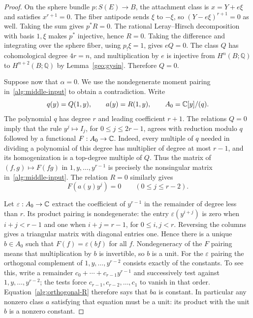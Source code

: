 \begin{proof}
On the sphere bundle $p:S(E)\to B$, the attachment class is
$x=Y+e\xi$ and satisfies $x^{r+1}=0$.  The fiber antipode sends $\xi$
to $-\xi$, so $(Y-e\xi)^{r+1}=0$ as well.  Taking the sum gives
$p^*R=0$.  The rational Leray--Hirsch decomposition with basis $1,\xi$
makes $p^*$ injective, hence $R=0$.  Taking the difference and integrating
over the sphere fiber, using $p_!\xi=1$, gives $eQ=0$.  The class $Q$ has
cohomological degree $4r=n$, and multiplication by $e$ is injective from
$H^n(B;\mathbb Q)$ to $H^{n+2}(B;\mathbb Q)$ by
Lemma~\ref{geo:gysin}.  Therefore $Q=0$.

Suppose now that $\alpha=0$.  We use the nondegenerate moment pairing
in~\eqref{alg:middle-input} to obtain a contradiction.  Write
\[
 q(y)=Q(1,y),\qquad a(y)=R(1,y),\qquad
 A_0=\mathbb C[y]/(q).
\]
The polynomial $q$ has degree $r$ and leading coefficient $r+1$.
The relations $Q=0$ imply that the rule $y^j\mapsto I_j$, for
$0\le j\le2r-1$, agrees with reduction modulo $q$ followed by a
functional $F:A_0\to\mathbb C$.  Indeed, every multiple of $q$ needed in
dividing a polynomial of this degree has multiplier of degree at most
$r-1$, and its homogenization is a top-degree multiple of $Q$.
Thus the matrix of $(f,g)\mapsto F(fg)$ in $1,y,\ldots,y^{r-1}$ is
precisely the nonsingular matrix in~\eqref{alg:middle-input}.
The relation $R=0$ similarly gives
\begin{equation}
 F(a(y)y^j)=0\qquad(0\le j\le r-2).
 \label{alg:orthogonal-R}
\end{equation}

Let $\varepsilon:A_0\to\mathbb C$ extract the coefficient of $y^{r-1}$
in the remainder of degree less than $r$.  Its product pairing is
nondegenerate: the entry $\varepsilon(y^{i+j})$ is zero when
$i+j<r-1$ and one when $i+j=r-1$, for $0\le i,j<r$.
Reversing the columns gives a triangular matrix with diagonal entries one.
Hence there is a unique $b\in A_0$ such that
$F(f)=\varepsilon(bf)$ for all $f$.  Nondegeneracy of the $F$ pairing
means that multiplication by $b$ is invertible, so $b$ is a unit.
For the $\varepsilon$ pairing the orthogonal complement of
$1,y,\ldots,y^{r-2}$ consists exactly of the constants.  To see this,
write a remainder $c_0+\cdots+c_{r-1}y^{r-1}$ and successively test
against $1,y,\ldots,y^{r-2}$; the tests force
$c_{r-1},c_{r-2},\ldots,c_1$ to vanish in that order.
Equation~\eqref{alg:orthogonal-R} therefore says that $ba$ is constant.
In particular any nonzero class $a$ satisfying that equation must be a
unit: its product with the unit $b$ is a nonzero constant.


\end{proof}

